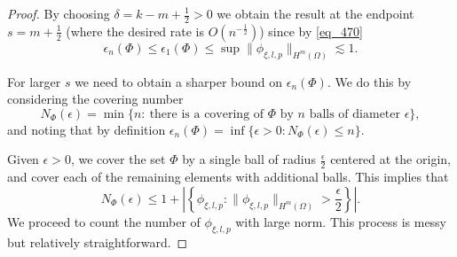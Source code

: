 \begin{proof}
 By choosing $\delta = k-m+\frac{1}{2} > 0$ we obtain the result at the endpoint $s = m+\frac{1}{2}$ (where the desired rate is $O(n^{-\frac{1}{2}})$) since by \eqref{eq_470} $$\epsilon_n(\Phi)\leq \epsilon_1(\Phi)\leq \sup \|\phi_{\xi,l,p}\|_{H^m(\Omega)}\lesssim 1.$$
 
 For larger $s$ we need to obtain a sharper bound on $\epsilon_n(\Phi)$. We do this by considering the covering number 
 \begin{equation}
  N_\Phi(\epsilon) = \min\{n:~\text{there is a covering of $\Phi$ by $n$ balls of diameter $\epsilon$}\},
 \end{equation}
 and noting that by definition $\epsilon_n(\Phi) = \inf\{\epsilon > 0: N_\Phi(\epsilon) \leq n\}$. 
 
 Given $\epsilon > 0$, we cover the set $\Phi$ by a single ball of radius $\frac{\epsilon}{2}$ centered at the origin, and cover each of the remaining elements with additional balls. This implies that
 \begin{equation}
  N_\Phi(\epsilon) \leq 1 + \left|\left\{\phi_{\xi,l,p}: \|\phi_{\xi,l,p}\|_{H^m(\Omega)} > \frac{\epsilon}{2}\right\}\right|.
 \end{equation}
 We proceed to count the number of $\phi_{\xi,l,p}$ with large norm. This process is messy but relatively straightforward.
 

\end{proof}
